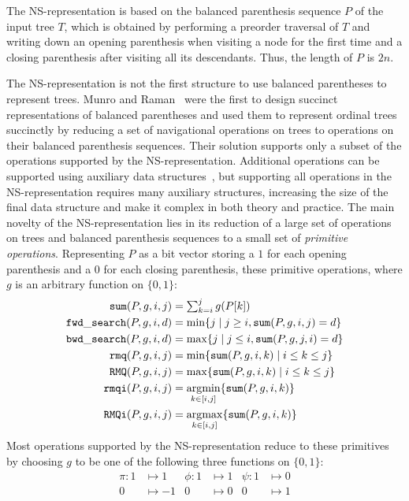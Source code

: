 The NS-representation is based on the balanced parenthesis sequence
$P$ of the input tree $T$, which is obtained by performing a preorder
traversal of $T$ and writing down an opening parenthesis when visiting a node
for the first time and a closing parenthesis after visiting all
its descendants.  Thus, the length of $P$ is $2n$.

The NS-representa\-tion is not the first structure to use balanced
parentheses to represent trees.  Munro and Raman~\cite{mr1997} were
the first to design succinct representations of balanced parentheses
and used them to represent ordinal trees succinctly by reducing a set
of navigational operations on trees to operations on their balanced
parenthesis sequences.  Their solution supports only a subset of the
operations supported by the NS-representation.  Additional operations
can be supported using auxiliary data structures~\cite{ly2008}, but
supporting all operations in the NS-representation requires many
auxiliary structures, increasing the size of the final data structure
and make it complex in both theory and practice.  The main novelty of
the NS-representation lies in its reduction of a large set of
operations on trees and balanced parenthesis sequences to a small set
of \emph{primitive operations}.  Representing $P$ as a bit vector
storing a $1$ for each opening parenthesis and a $0$ for each closing
parenthesis, these primitive operations, where $g$ is an arbitrary
function on $\{0,1\}$:
  \begin{align*}
    \mathtt{sum}(P,g,i,j) &= \textstyle\sum_{k=i}^jg(P[k])\\
    \mathtt{fwd\_search}(P,g,i,d) &= \min\{j \mid j \ge i, \mathtt{sum}(P,g,i,j) = d\}\\
    \mathtt{bwd\_search}(P,g,i,d) &= \max\{j \mid j \le i, \mathtt{sum}(P,g,j,i) = d\}\\
    \mathtt{rmq}(P,g,i,j) &= \min\{\mathtt{sum}(P,g,i,k) \mid i\le k\le j\}\\
    \mathtt{RMQ}(P,g,i,j) &= \max\{\mathtt{sum}(P,g,i,k) \mid i\le k\le j\}\\
    \mathtt{rmqi}(P,g,i,j) &= \operatorname*{arg\!\min}_{k\in[i,j]}\{\mathtt{sum}(P,g,i,k)\}\\
    \mathtt{RMQi}(P,g,i,j) &= \operatorname*{arg\!\max}_{k\in[i,j]}\{\mathtt{sum}(P,g,i,k)\}
  \end{align*}
Most operations supported by the NS-representation reduce to these primitives
by choosing $g$ to be one of the following three functions on $\{0,1\}$:
\begin{align*}
\pi : 1 &\mapsto 1 &\phi : 1 &\mapsto 1 & \psi : 1 &\mapsto 0\\
0 &\mapsto -1 & 0 &\mapsto 0 & 0 &\mapsto 1
\end{align*}
